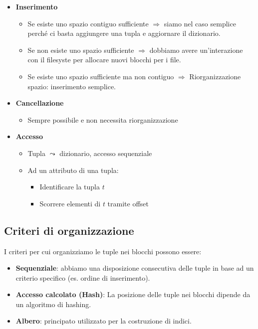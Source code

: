 \documentclass[a4paper]{article}
\begin{document}
\begin{itemize}
    \item \textbf{Inserimento}
    \begin{itemize}
        \item Se esiste uno spazio contiguo sufficiente $\Rightarrow$ siamo nel caso semplice
        perché ci basta aggiungere una tupla e aggiornare il dizionario.
        \item Se non esiste uno spazio sufficiente $\Rightarrow$
        dobbiamo avere un'interazione con il filesyste per allocare nuovi blocchi per
        i file.
        \item Se esiste uno spazio sufficiente ma non contiguo $\Rightarrow$
        Riorganizzazione spazio: inserimento semplice.
    \end{itemize}
    \item \textbf{Cancellazione}
    \begin{itemize}
        \item Sempre possibile e non necessita riorganizzazione
    \end{itemize}
    \item  \textbf{Accesso}
    \begin{itemize}
        \item Tupla $\leadsto$ dizionario, accesso sequenziale
        \item Ad un attributo di una tupla:
        \begin{itemize}
            \item Identificare la tupla $t$
            \item Scorrere elementi di $t$ tramite offset
        \end{itemize}
    \end{itemize}
\end{itemize}

\subsection{Criteri di organizzazione}

I criteri per cui organizziamo le tuple nei blocchi possono essere:

\begin{itemize}
    \item \textbf{Sequenziale}: abbiamo una disposizione consecutiva
    delle tuple in base ad un criterio specifico (es. ordine di inserimento).
    \item \textbf{Accesso calcolato (Hash)}: La posizione delle tuple nei blocchi
    dipende da un algoritmo di hashing.
    \item \textbf{Albero}: principato utilizzato per la costruzione di indici.
\end{itemize}
\end{document}
